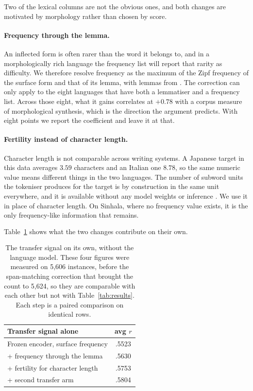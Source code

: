 Two of the lexical columns are not the obvious ones, and both changes
are motivated by morphology rather than chosen by score.

\paragraph{Frequency through the lemma.} An inflected form is often
rarer than the word it belongs to, and in a morphologically rich
language the frequency list will report that rarity as difficulty. We
therefore resolve frequency as the maximum of the Zipf frequency of the
surface form and that of its lemma, with lemmas from
\citet{qi-etal-2020-stanza}. The correction can only apply to the eight
languages that have both a lemmatiser and a frequency list. Across those
eight, what it gains correlates at $+0.78$ with a corpus measure of
morphological synthesis, which is the direction the argument predicts.
With eight points we report the coefficient and leave it at that.

\paragraph{Fertility instead of character length.} Character length is
not comparable across writing systems. A Japanese target in this data
averages $3.59$ characters and an Italian one $8.78$, so the same
numeric value means different things in the two languages. The number of
subword units the tokeniser produces for the target is by construction
in the same unit everywhere, and it is available without any model
weights or inference \citep{rust-etal-2021-good}. We use it in place of
character length. On Sinhala, where no frequency value exists, it is the
only frequency-like information that remains.

Table~\ref{tab:aarm} shows what the two changes contribute on their own.

\begin{table}[t]
\centering
\small
\begin{tabular}{lc}
\toprule
Transfer signal alone & avg $r$ \\
\midrule
Frozen encoder, surface frequency      & .5523 \\
\quad + frequency through the lemma    & .5630 \\
\quad + fertility for character length & .5753 \\
\quad + second transfer arm            & .5804 \\
\bottomrule
\end{tabular}
\caption{The transfer signal on its own, without the language model.
These four figures were measured on 5{,}606 instances, before the
span-matching correction that brought the count to 5{,}624, so they are
comparable with each other but not with Table~\ref{tab:results}. Each
step is a paired comparison on identical rows.}
\label{tab:aarm}
\end{table}

